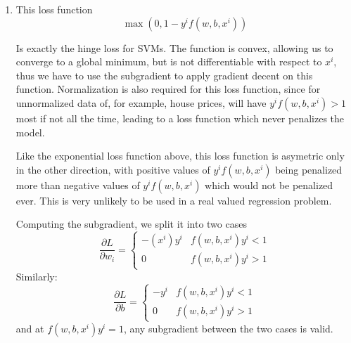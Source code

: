 \documentclass{article} %
\begin{document}
\begin{enumerate}
    Another, relatively minor, feature of this loss function is that
    it is $C^\infty(\mathbb{R})$, meaning that in the abstract at
    least, the gradient decent algorithm will be more stable and
    effecient. As well as allowing us to directly calculate the gradient.

    A calculation of the gradient follows:
    \begin{align*}
      \frac{\partial L_i}{\partial w_n} &= \exp[w^Tx^i + b - y^i](x^i_n) \\
      \frac{\partial L_i}{\partial b} &= \exp[w^Tx^i + b - y^i]
    \end{align*}
    Thus
    \[
      \nabla L_i =
      \begin{pmatrix}
        \exp[w^Tx^0 + b - y^0]x^0 \\
        \exp[w^Tx^1 + b - y^1]x^1 \\
        \hdots\\
        \exp[w^Tx^i + b - y^i]
      \end{pmatrix}
    \]
  \item This loss function
    \[
      \max(0, 1 - y^if(w,b,x^i))
    \]

    Is exactly the hinge loss for SVMs. The function is convex,
    allowing us to converge to a global minimum, but is not
    differentiable with respect to $x^i$, thus we have to use the
    subgradient to apply gradient decent on this function.
    Normalization is also required for this loss function, since for
    unnormalized data of, for example, house prices, will have
    $y^if(w,b,x^i) > 1$ most if not all the time, leading to a loss
    function which never penalizes the model.

    Like the exponential loss function above, this loss function is
    asymetric only in the other direction, with positive values of
    $y^if(w,b,x^i)$ being penalized more than negative values of
    $y^if(w,b,x^i)$ which would not be penalized ever. This is very
    unlikely to be used in a real valued regression problem.

    Computing the subgradient, we split it into two cases
    \[
      \frac{\partial L}{\partial w_i} =
      \begin{cases}
        -(x^i)y^i  &f(w,b,x^i)y^i < 1\\
        0  &f(w,b,x^i)y^i > 1
      \end{cases}
    \]
    Similarly:
    \[
      \frac{\partial L}{\partial b} =
      \begin{cases}
        -y^i  &f(w,b,x^i)y^i < 1\\
        0  &f(w,b,x^i)y^i > 1
      \end{cases}
    \]
    and at $f(w,b,x^i)y^i = 1$, any subgradient between the two cases
    is valid.
\end{enumerate}
\end{document}
